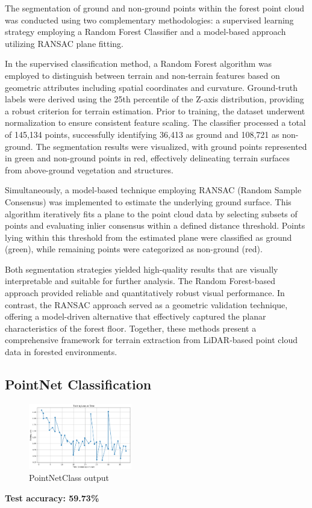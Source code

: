 \documentclass[../report.tex]{subfiles}
\begin{document}
    The segmentation of ground and non-ground points within the forest point cloud was conducted using two complementary methodologies: a supervised learning strategy employing a Random Forest Classifier and a model-based approach utilizing RANSAC plane fitting.
    
    In the supervised classification method, a Random Forest algorithm was employed to distinguish between terrain and non-terrain features based on geometric attributes including spatial coordinates and curvature. Ground-truth labels were derived using the 25th percentile of the Z-axis distribution, providing a robust criterion for terrain estimation. Prior to training, the dataset underwent normalization to ensure consistent feature scaling. The classifier processed a total of 145,134 points, successfully identifying 36,413 as ground and 108,721 as non-ground. The segmentation results were visualized, with ground points represented in green and non-ground points in red, effectively delineating terrain surfaces from above-ground vegetation and structures.
    
    Simultaneously, a model-based technique employing RANSAC (Random Sample Consensus) was implemented to estimate the underlying ground surface. This algorithm iteratively fits a plane to the point cloud data by selecting subsets of points and evaluating inlier consensus within a defined distance threshold. Points lying within this threshold from the estimated plane were classified as ground (green), while remaining points were categorized as non-ground (red).
    
    Both segmentation strategies yielded high-quality results that are visually interpretable and suitable for further analysis. The Random Forest-based approach provided reliable and quantitatively robust visual performance. In contrast, the RANSAC approach served as a geometric validation technique, offering a model-driven alternative that effectively captured the planar characteristics of the forest floor. Together, these methods present a comprehensive framework for terrain extraction from LiDAR-based point cloud data in forested environments.
    
\subsection{PointNet Classification}
\begin{figure}[H]
    \centering
    \includegraphics[width=0.4\textwidth]{rnd-project-report-main/figures/PointNetClass.png}
    \caption{PointNetClass output}
\end{figure}
        \noindent\textbf{Test accuracy:  59.73\%}
    
\end{document}
